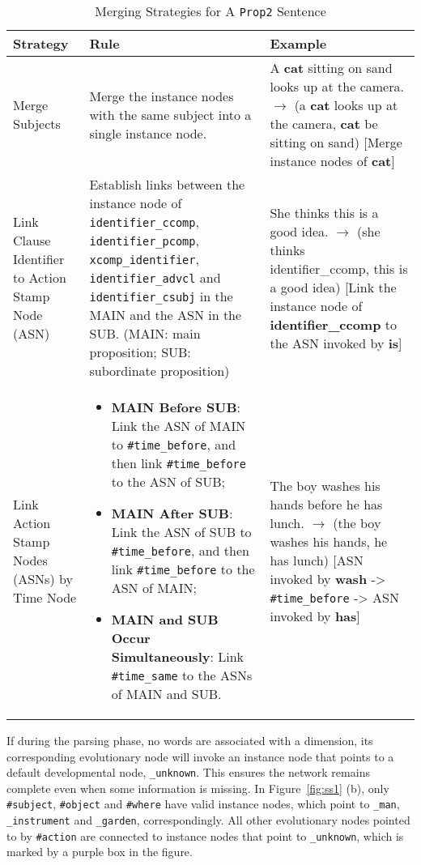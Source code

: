 \begin{table*}[h!]
\centering
\small
\renewcommand{\arraystretch}{1.2}
\begin{tabular}{@{}p{2.5cm}p{6cm}p{6cm}@{}}
\toprule
\textbf{Strategy} & \textbf{Rule} & \textbf{Example} \\ \midrule
Merge Subjects & Merge the instance nodes with the same subject into a single instance node. & A \textbf{cat} sitting on sand looks up at the camera. $\rightarrow$ (a \textbf{cat} looks up at the camera, \textbf{cat} be sitting on sand) [Merge instance nodes of \textbf{cat}] \\

Link Clause Identifier to Action Stamp Node (ASN) & Establish links between the instance node of \texttt{identifier\_ccomp}, \texttt{identifier\_pcomp}, \texttt{xcomp\_identifier}, \texttt{identifier\_advcl} and \texttt{identifier\_csubj} in the MAIN and the ASN in the SUB. (MAIN: main proposition; SUB: subordinate proposition) & She thinks this is a good idea. $\rightarrow$ (she thinks identifier\_ccomp, this is a good idea) [Link the instance node of \textbf{identifier\_ccomp} to the ASN invoked by \textbf{is}] \\
Link Action Stamp Nodes (ASNs) by Time Node & 

\begin{itemize}[leftmargin=*,nosep,after=\strut]
    \item \textbf{MAIN Before SUB}: Link the ASN of MAIN to \texttt{\#time\_before}, and then link \texttt{\#time\_before} to the ASN of SUB;
    \item \textbf{MAIN After SUB}: Link the ASN of SUB to \texttt{\#time\_before}, and then link \texttt{\#time\_before} to the ASN of MAIN;
    \item \textbf{MAIN and SUB Occur Simultaneously}: Link \texttt{\#time\_same} to the ASNs of MAIN and SUB.
\end{itemize} &

The boy washes his hands before he has lunch. $\rightarrow$ (the boy washes his hands, he has lunch) [ASN invoked by \textbf{wash} -> \texttt{\#time\_before} -> ASN invoked by \textbf{has}] \\ \bottomrule
\end{tabular}
\caption{Merging Strategies for A \texttt{Prop2} Sentence}
\label{tab:merge_2v_cs}
\end{table*}


If during the parsing phase, no words are associated with a dimension, its corresponding evolutionary node will invoke an instance node that points to a default developmental node, \texttt{\_unknown}. This ensures the network remains complete even when some information is missing. In Figure~\ref{fig:ss1} (b), only \texttt{\#subject}, \texttt{\#object} and \texttt{\#where} have valid instance nodes, which point to \texttt{\_man}, \texttt{\_instrument} and \texttt{\_garden}, correspondingly. All other evolutionary nodes pointed to by \texttt{\#action}  are connected to instance nodes that point to \texttt{\_unknown}, which is marked by a purple box in the figure.


